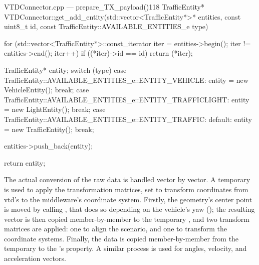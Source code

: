 \begin{codelist}{VTDConnector.cpp --- prepare\_TX\_payload()}{118}
TrafficEntity* VTDConnector::get_add_entity(std::vector<TrafficEntity*>* entities, const uint8_t id, const TrafficEntity::AVAILABLE_ENTITIES_e type) {
	for (std::vector<TrafficEntity*>::const_iterator iter = entities->begin(); iter != entities->end(); iter++)
		if ((*iter)->id == id)
			return (*iter);

	TrafficEntity* entity;
	switch (type) {
		case TrafficEntity::AVAILABLE_ENTITIES_e::ENTITY_VEHICLE:
			entity = new VehicleEntity();
			break;
		case TrafficEntity::AVAILABLE_ENTITIES_e::ENTITY_TRAFFICLIGHT:
			entity = new LightEntity();
			break;
		case TrafficEntity::AVAILABLE_ENTITIES_e::ENTITY_TRAFFIC:
		default:
			entity = new TrafficEntity();
			break;
	}

	entities->push_back(entity);

	return entity;
}
\end{codelist}

The actual conversion of the raw data is handled vector by vector. A temporary  is used to apply the transformation matrices, set to transform coordinates from \gls{vtd}'s to the \gls{middleware}'s coordinate system. Firstly, the geometry's center point is moved by calling , that does so depending on the vehicle's yaw (); the resulting vector is then copied member-by-member to the temporary , and two transform matrices are applied: one to align the scenario, and one to transform the coordinate systems. Finally, the data is copied member-by-member from the temporary  to the 's  property. A similar process is used for angles, velocity, and acceleration vectors.

